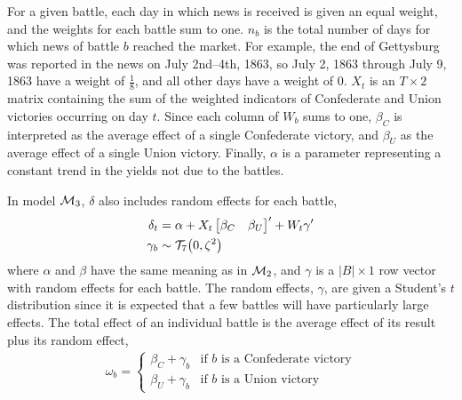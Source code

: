 For a given battle, each day in which news is received is given an equal weight, and the weights for each battle sum to one.
$n_{b}$ is the total number of days for which news of battle $b$ reached the market.
For example, the end of Gettysburg was reported in the news on July 2nd--4th, 1863, so July 2, 1863 through July 9, 1863 have a weight of $\frac{1}{8}$, and all other days have a weight of 0.
$X_{t}$ is an $T \times 2$ matrix containing the sum of the weighted indicators of Confederate and Union victories occurring on day $t$. 
Since each column of $W_{b}$ sums to one, $\beta_{C}$ is interpreted as the average effect of a single Confederate victory, and $\beta_{U}$ as the average effect of a single Union victory.
Finally, $\alpha$ is a parameter representing a constant trend in the yields not due to the battles.

In model $\mathcal{M}_{\text{3}}$, $\delta$ also includes random effects for each battle,
\begin{align}
  \label{bonds:eq:10}
  \delta_{t} &= \alpha + X_{t} \begin{bmatrix}\beta_{C} & \beta_{U}\end{bmatrix}' + W_{t} \gamma' \\
  \label{bonds:eq:12}
  \gamma_{b} &\sim \mathcal{T}_{7}\mathopen{}\left(0, \zeta^{2}\right)\mathclose{}
\end{align}
where $\alpha$ and $\beta$ have the same meaning as in $\mathcal{M}_{\text{2}}$, and $\gamma$ is a $|B| \times 1$ row vector with random effects for each battle.
The random effects, $\gamma$, are given a Student's $t$ distribution since it is expected that a few battles will have particularly large effects.
The total effect of an individual battle is the average effect of its result plus its random effect,
\begin{align}
  \omega_{b} =
  \begin{cases}
    \beta_{C} + \gamma_{b} & \text{if $b$ is a Confederate victory} \\
    \beta_{U} + \gamma_{b} & \text{if $b$ is a Union victory}
  \end{cases}
\end{align}

